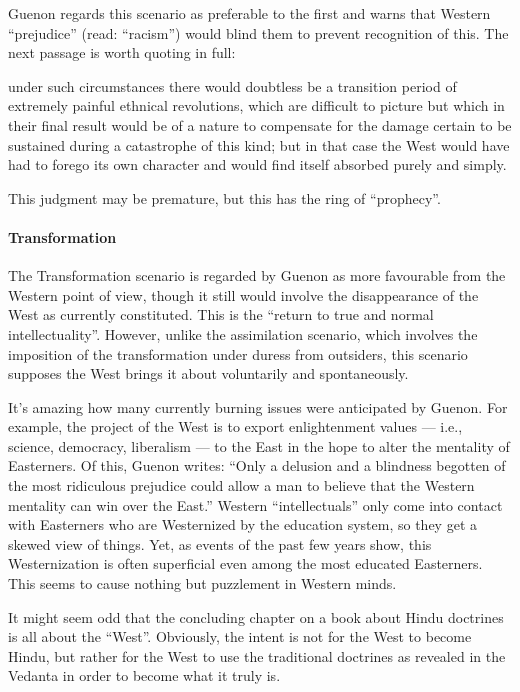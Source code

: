 Guenon regards this scenario as preferable to the first and warns that Western ``prejudice'' (read: ``racism'') would blind them to prevent recognition of this. The next passage is worth quoting in full:

\begin{quotex}
under such circumstances there would doubtless be a transition period of extremely painful ethnical revolutions, which are difficult to picture but which in their final result would be of a nature to compensate for the damage certain to be sustained during a catastrophe of this kind; but in that case the West would have had to forego its own character and would find itself absorbed purely and simply.
\end{quotex}


This judgment may be premature, but this has the ring of ``prophecy''.

\paragraph{Transformation}


The Transformation scenario is regarded by Guenon as more favourable from the Western point of view, though it still would involve the disappearance of the West as currently constituted. This is the ``return to true and normal intellectuality''. However, unlike the assimilation scenario, which involves the imposition of the transformation under duress from outsiders, this scenario supposes the West brings it about voluntarily and spontaneously.

It's amazing how many currently burning issues were anticipated by Guenon. For example, the project of the West is to export enlightenment values --- i.e., science, democracy, liberalism --- to the East in the hope to alter the mentality of Easterners. Of this, Guenon writes: ``Only a delusion and a blindness begotten of the most ridiculous prejudice could allow a man to believe that the Western mentality can win over the East.'' Western ``intellectuals'' only come into contact with Easterners who are Westernized by the education system, so they get a skewed view of things. Yet, as events of the past few years show, this Westernization is often superficial even among the most educated Easterners. This seems to cause nothing but puzzlement in Western minds.

It might seem odd that the concluding chapter on a book about Hindu doctrines is all about the ``West''. Obviously, the intent is not for the West to become Hindu, but rather for the West to use the traditional doctrines as revealed in the Vedanta in order to become what it truly is.

